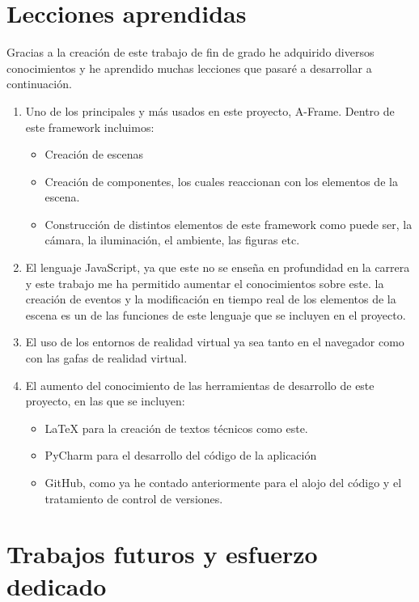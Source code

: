 \documentclass[a4paper, 12pt]{book}
\begin{document}
\section{Lecciones aprendidas}
\label{sec:lecciones_aprendidas}

Gracias a la creación de este trabajo de fin de grado he adquirido diversos conocimientos y he aprendido muchas lecciones que pasaré a desarrollar a continuación.
\begin{enumerate}
  \item Uno de los principales y más usados en este proyecto, A-Frame. Dentro de este framework incluimos:
  \begin{itemize}
      \item Creación de escenas
      \item Creación de componentes, los cuales reaccionan con los elementos de la escena.
      \item Construcción de distintos elementos de este framework como puede ser, la cámara, la iluminación, el ambiente, las figuras etc.
  \end{itemize}
  \item El lenguaje JavaScript, ya que este no se enseña en profundidad en la carrera y este trabajo me ha permitido aumentar el conocimientos sobre este. la creación de eventos y la modificación en tiempo real de los elementos de la escena es un de las funciones de este lenguaje que se incluyen en el proyecto.
  \item El uso de los entornos de realidad virtual ya sea tanto en el navegador como con las gafas de realidad virtual.
  \item El aumento del conocimiento de las herramientas de desarrollo de este proyecto, en las que se incluyen:
  \begin{itemize}
      \item LaTeX para la creación de textos técnicos como este.
      \item PyCharm para el desarrollo del código de la aplicación
      \item GitHub, como ya he contado anteriormente para el alojo del código y el tratamiento de control de versiones.
  \end{itemize}
\end{enumerate}


\section{Trabajos futuros y esfuerzo dedicado}
\label{sec:trabajos_futuros}
\end{document}
